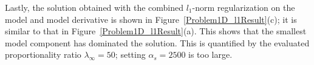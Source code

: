 Lastly, the solution obtained with the combined $l_1$-norm regularization on the model and model derivative is shown in Figure~\ref{Problem1D_l1Result}(c); it is similar to that in Figure~\ref{Problem1D_l1Result}(a). This shows that the smallest model component has dominated the solution. This is quantified by the evaluated proportionality ratio $\lambda_\infty=50$; setting $\alpha_s=2500$ is too large.
